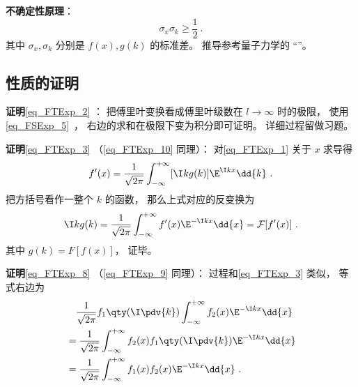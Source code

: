 \textbf{不确定性原理}：
\begin{equation}
\sigma_x \sigma_k \geqslant \frac{1}{2}~.
\end{equation}
其中 $\sigma_x, \sigma_k$ 分别是 $f(x), g(k)$ 的标准差。 推导参考量子力学的 “”。

\subsection{性质的证明}

\textbf{证明}\autoref{eq_FTExp_2} ： 把傅里叶变换看成傅里叶级数在 $l \to \infty$ 时的极限， 使用\autoref{eq_FSExp_5}~， 右边的求和在极限下变为积分即可证明。 详细过程留做习题。

\textbf{证明}\autoref{eq_FTExp_3} （\autoref{eq_FTExp_10} 同理）： 对\autoref{eq_FTExp_1} 关于 $x$ 求导得
\begin{equation}
f'(x) = \frac{1}{\sqrt{2\pi }} \int_{-\infty }^{+\infty } [\I kg(k)]\E^{\I kx} \dd{k}~.
\end{equation}
把方括号看作一整个 $k$ 的函数， 那么上式对应的反变换为
\begin{equation}
\I kg(k) = \frac{1}{\sqrt{2\pi }} \int_{-\infty }^{+\infty } f'(x) \E^{-\I kx} \dd{x} = \mathcal F [f'(x)]~.
\end{equation}
其中 $g(k) = F [f(x)]$， 证毕。

\textbf{证明}\autoref{eq_FTExp_8} （\autoref{eq_FTExp_9} 同理）： 过程和\autoref{eq_FTExp_3} 类似， 等式右边为
\begin{equation}
\begin{aligned}
& \quad \frac{1}{\sqrt{2\pi }} f_1\qty(\I \pdv{k}) \int_{-\infty }^{+\infty } f_2(x)\E^{-\I kx} \dd{x}\\
&= \frac{1}{\sqrt{2\pi }} \int_{-\infty }^{+\infty } f_2(x) f_1\qty(\I \pdv{k})\E^{-\I kx} \dd{x}\\
&= \frac{1}{\sqrt{2\pi }} \int_{-\infty }^{+\infty } f_1(x) f_2(x) \E^{-\I kx} \dd{x}~.
\end{aligned}
\end{equation}
